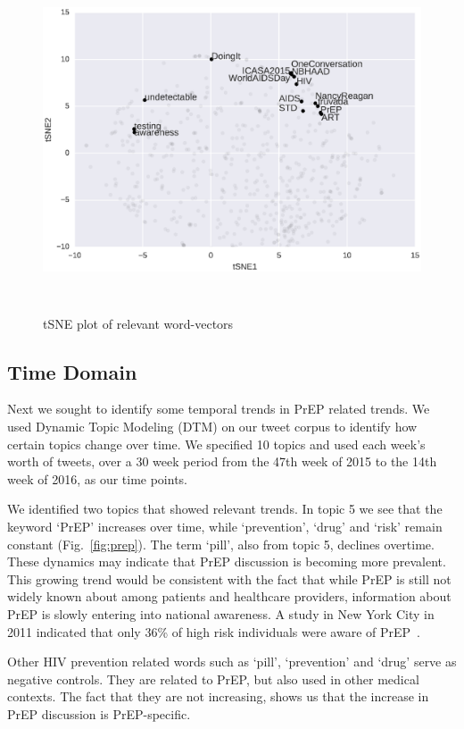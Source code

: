 \documentclass[conference]{IEEEtran}
\begin{document}
\begin{figure}
\centering
\includegraphics[height=4in, width=6in]{figs/Fig2}
\caption{tSNE plot of relevant word-vectors}
\label{fig:tsne}
\end{figure}

\subsection{Time Domain}

Next we sought to identify some temporal trends in PrEP related trends. We used Dynamic Topic Modeling (DTM) on our tweet corpus to identify how certain topics change over time. We specified 10 topics and used each week's worth of tweets, over a 30 week period from the 47th week of 2015 to the 14th week of 2016, as our time points.

We identified two topics that showed relevant trends. In topic 5 we see that the keyword `PrEP' increases over time, while `prevention', `drug' and `risk' remain constant (Fig.~\ref{fig:prep}). The term `pill', also from topic 5, declines overtime. These dynamics may indicate that PrEP discussion is becoming more prevalent. This growing trend would be consistent with the fact that while PrEP is still not widely known about among patients and healthcare providers, information about PrEP is slowly entering into national awareness. A study in New York City in 2011 indicated that only 36\% of high risk individuals were aware of PrEP~\cite{mehta2011awareness}.

Other HIV prevention related words such as `pill', `prevention' and `drug' serve as negative controls. They are related to PrEP, but also used in other medical contexts. The fact that they are not increasing, shows us that the increase in PrEP discussion is PrEP-specific.
\end{document}
